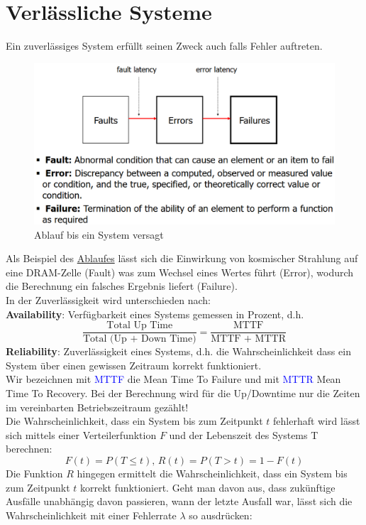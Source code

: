 \documentclass[a4paper,12pt,leqno]{article}
\newcommand{\blue}[1]{\textcolor{blue}{#1}}
\begin{document}
\section{Verlässliche Systeme}
Ein zuverlässiges System erfüllt seinen Zweck auch falls Fehler auftreten.
\begin{figure}
\centering
\includegraphics[scale=0.4]{Grafiken/AblaufZumVersagen.png}
\caption{Ablauf bis ein System versagt}
\label{Image:Versagensplan}
\end{figure}
Als Beispiel des \hyperref[Image:Versagensplan]{Ablaufes} lässt sich die Einwirkung von kosmischer Strahlung auf eine DRAM-Zelle (Fault) was zum Wechsel eines Wertes führt (Error), wodurch die Berechnung ein falsches Ergebnis liefert (Failure).\\
In der Zuverlässigkeit wird unterschieden nach:\\
\textbf{Availability}: Verfügbarkeit eines Systems gemessen in Prozent, d.h. 
$$\frac{\textrm{Total Up Time}}{\textrm{Total (Up + Down Time)}}=\frac{\textrm{MTTF}}{\textrm{MTTF + MTTR}}$$
\textbf{Reliability}: Zuverlässigkeit eines Systems, d.h. die Wahrscheinlichkeit dass ein System über einen gewissen Zeitraum korrekt funktioniert.\\
Wir bezeichnen mit \blue{MTTF} die Mean Time To Failure und mit \blue{MTTR} Mean Time To Recovery. Bei der Berechnung wird für die Up/Downtime nur die Zeiten im vereinbarten Betriebszeitraum gezählt!\\
Die Wahrscheinlichkeit, dass ein System bis zum Zeitpunkt $t$ fehlerhaft wird lässt sich mittels einer Verteilerfunktion $F$ und der Lebenszeit des Systems T berechnen:
$$F(t)=P(T\leq t)\textrm{, } R(t)=P(T>t)=1-F(t)$$
Die Funktion $R$ hingegen ermittelt die Wahrscheinlichkeit, dass ein System bis zum Zeitpunkt $t$ korrekt funktioniert.
Geht man davon aus, dass zukünftige Ausfälle unabhängig davon passieren, wann der letzte Ausfall war, lässt sich die Wahrscheinlichkeit mit einer Fehlerrate $\lambda$ so ausdrücken:\\
\end{document}
